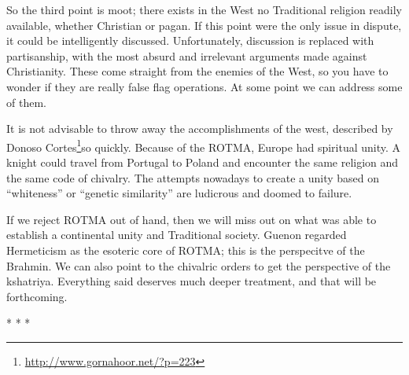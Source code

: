 So the third point is moot; there exists in the West no Traditional religion readily available, whether Christian or pagan. If this point were the only issue in dispute, it could be intelligently discussed. Unfortunately, discussion is replaced with partisanship, with the most absurd and irrelevant arguments made against Christianity. These come straight from the enemies of the West, so you have to wonder if they are really false flag operations. At some point we can address some of them.

It is not advisable to throw away the accomplishments of the west, described by Donoso Cortes\footnote{\url{http://www.gornahoor.net/?p=223}}so quickly. Because of the ROTMA, Europe had spiritual unity. A knight could travel from Portugal to Poland and encounter the same religion and the same code of chivalry. The attempts nowadays to create a unity based on ``whiteness'' or ``genetic similarity'' are ludicrous and doomed to failure.

If we reject ROTMA out of hand, then we will miss out on what was able to establish a continental unity and Traditional society. Guenon regarded Hermeticism as the esoteric core of ROTMA; this is the perspecitve of the Brahmin. We can also point to the chivalric orders to get the perspective of the kshatriya. Everything said deserves much deeper treatment, and that will be forthcoming.



\begin{center}* * *\end{center}

